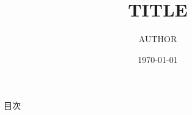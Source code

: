 \documentclass[dvipdfmx,11pt,uplatex, notheorems]{beamer}
\title{TITLE}
\author{AUTHOR}
\date{\today}
\begin{document}
\frame{\maketitle}

\begin{frame}{目次}
  \tableofcontents
\end{frame}




\end{document}
